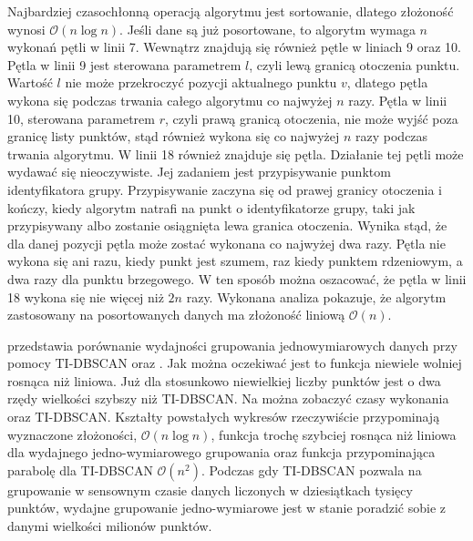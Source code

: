Najbardziej czasochłonną operacją algorytmu jest sortowanie, dlatego złożoność wynosi $ \mathcal{O}(n\log{}n) $. Jeśli dane są już posortowane, to algorytm wymaga $ n $ wykonań pętli w linii 7. Wewnątrz znajdują się również pętle w liniach 9 oraz 10. Pętla w linii 9 jest sterowana parametrem $ l $, czyli lewą granicą otoczenia punktu. Wartość $ l $ nie może przekroczyć pozycji aktualnego punktu $ v $, dlatego pętla wykona się podczas trwania całego algorytmu co najwyżej $ n $ razy. Pętla w linii 10, sterowana parametrem $ r $, czyli prawą granicą otoczenia, nie może wyjść poza granicę listy punktów, stąd również wykona się co najwyżej $ n $ razy podczas trwania algorytmu. W linii 18 również znajduje się pętla. Działanie tej pętli może wydawać się nieoczywiste. Jej zadaniem jest przypisywanie punktom identyfikatora grupy. Przypisywanie zaczyna się od prawej granicy otoczenia i kończy, kiedy algorytm natrafi na punkt o identyfikatorze grupy, taki jak przypisywany albo zostanie osiągnięta lewa granica otoczenia. Wynika stąd, że dla danej pozycji pętla może zostać wykonana co najwyżej dwa razy. Pętla nie wykona się ani razu, kiedy punkt jest szumem, raz kiedy punktem rdzeniowym, a dwa razy dla punktu brzegowego. W ten sposób można oszacować, że pętla w linii 18 wykona się nie więcej niż $ 2n $ razy. Wykonana analiza pokazuje, że algorytm zastosowany na posortowanych danych ma złożoność liniową $ \mathcal{O}(n). $\par



 przedstawia porównanie wydajności grupowania jednowymiarowych danych przy pomocy TI-DBSCAN oraz . Jak można oczekiwać jest to funkcja niewiele wolniej rosnąca niż liniowa. Już dla stosunkowo niewielkiej liczby punktów  jest o dwa rzędy wielkości szybszy niż TI-DBSCAN. Na  można zobaczyć czasy wykonania  oraz TI-DBSCAN. Kształty powstałych wykresów rzeczywiście przypominają wyznaczone złożoności, $ \mathcal{O}(n\log{}n) $, funkcja trochę szybciej rosnąca niż liniowa dla wydajnego jedno-wymiarowego grupowania oraz funkcja przypominająca parabolę dla TI-DBSCAN $ \mathcal{O}(n^2) $. Podczas gdy TI-DBSCAN pozwala na grupowanie w sensownym czasie danych liczonych w dziesiątkach tysięcy punktów, wydajne grupowanie jedno-wymiarowe jest w stanie poradzić sobie z danymi wielkości milionów punktów.\par

